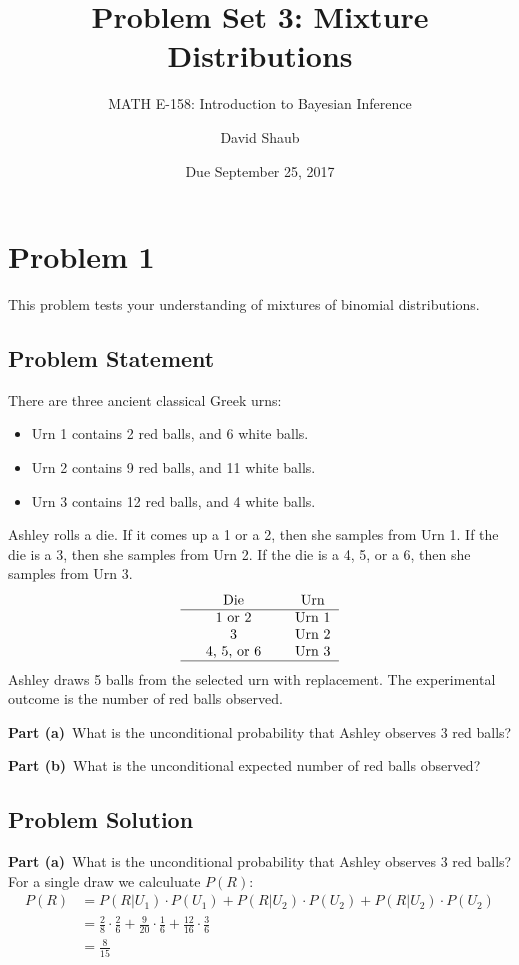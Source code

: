\documentclass[12pt]{article}
\title{Problem Set 3: Mixture Distributions}
\author{MATH E-158: Introduction to Bayesian Inference}
\author{David Shaub}
\date{Due September 25, 2017}
\theoremstyle{definition}
\begin{document}
	
	\maketitle





\section*{Problem 1}

This problem tests your understanding of mixtures of binomial distributions.

\subsection*{Problem Statement}

There are three ancient classical Greek urns:
\begin{itemize}
	\item Urn 1 contains 2 red balls, and 6 white balls.
	\item Urn 2 contains 9 red balls, and 11 white balls.
	\item Urn 3 contains 12 red balls, and 4 white balls.
\end{itemize}
Ashley rolls a die. If it comes up a 1 or a 2, then she samples from Urn 1. If the die is a 3, then she samples from Urn 2. If the die is a 4, 5, or a 6, then she samples from Urn 3.
$$
\begin{tabular}{ccccc}
& Die & & Urn \\
\hline
& 1 or 2 & & Urn 1\\
& 3 & & Urn 2\\
& 4, 5, or 6 & & Urn 3\\
\hline
\end{tabular}
$$
Ashley draws 5 balls from the selected urn with replacement. The experimental outcome is the number of red balls observed.

\bigskip
\noindent
{\bf Part (a)}\ What is the unconditional probability that Ashley observes 3 red balls?

\bigskip
\noindent
{\bf Part (b)}\ What is the unconditional expected number of red balls observed?

\subsection*{Problem Solution}
\noindent
{\bf Part (a)}\ What is the unconditional probability that Ashley observes 3 red balls?\\
For a single draw we calculuate $P(R)$:
\begin{align*}
P(R) &= P(R|U_1)\cdot P(U_1) + P(R|U_2)\cdot P(U_2) + P(R|U_2)\cdot P(U_2)\\
&= \frac{2}{8}\cdot\frac{2}{6} + \frac{9}{20}\cdot\frac{1}{6} + \frac{12}{16}\cdot\frac{3}{6}\\
&= \frac{8}{15}\\
\end{align*}
\end{document}
